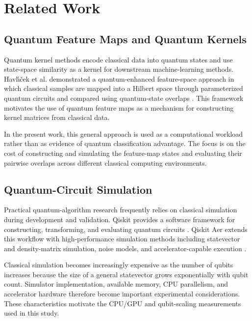 \documentclass[pdflatex,sn-mathphys-num]{sn-jnl}%
\theoremstyle{thmstyleone}%
\theoremstyle{thmstyletwo}%
\theoremstyle{thmstylethree}%
\begin{document}
\section{Related Work}\label{sec:related-work}

\subsection{Quantum Feature Maps and Quantum Kernels}
\label{subsec:related-quantum-kernels}

Quantum kernel methods encode classical data into quantum states and use
state-space similarity as a kernel for downstream machine-learning methods.
Havl\'{\i}\v{c}ek et al. demonstrated a quantum-enhanced feature-space
approach in which classical samples are mapped into a Hilbert space through
parameterized quantum circuits and compared using quantum-state overlaps
\cite{havlicek2019}. This framework motivates the use of quantum feature maps
as a mechanism for constructing kernel matrices from classical data.

In the present work, this general approach is used as a computational workload
rather than as evidence of quantum classification advantage. The focus is on
the cost of constructing and simulating the feature-map states and evaluating
their pairwise overlaps across different classical computing environments.


\subsection{Quantum-Circuit Simulation}
\label{subsec:related-simulation}

Practical quantum-algorithm research frequently relies on classical simulation
during development and validation. Qiskit provides a software framework for
constructing, transforming, and evaluating quantum circuits
\cite{qiskit2024}. Qiskit Aer extends this workflow with high-performance
simulation methods including statevector and density-matrix simulation, noise
models, and accelerator-capable execution \cite{qiskitaer2025}.

Classical simulation becomes increasingly expensive as the number of qubits
increases because the size of a general statevector grows exponentially with
qubit count. Simulator implementation, available memory, CPU parallelism, and
accelerator hardware therefore become important experimental considerations.
These characteristics motivate the CPU/GPU and qubit-scaling measurements used
in this study.
\end{document}
